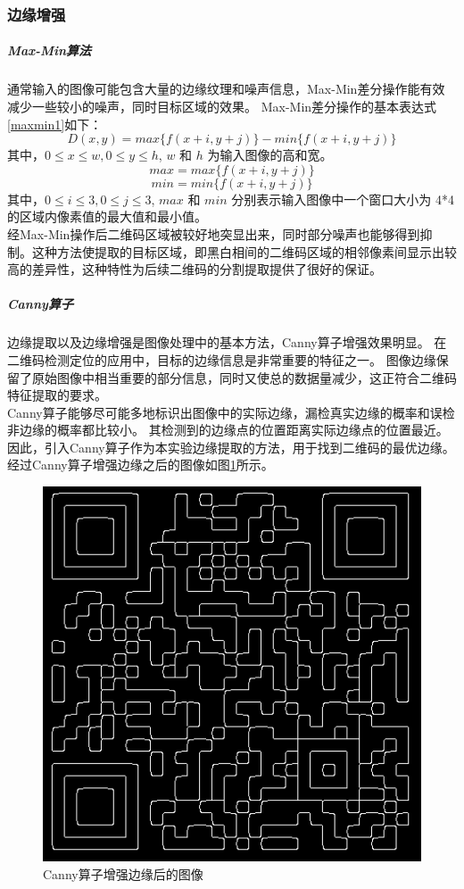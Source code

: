 \subsubsection{边缘增强}
\subparagraph{Max-Min算法}
通常输入的图像可能包含大量的边缘纹理和噪声信息，Max-Min差分操作\cite{13}能有效减少一些较小的噪声，同时目标区域的效果。
Max-Min差分操作的基本表达式\ref{maxmin1}如下：
\begin{equation}\label{maxmin1}
D(x,y) = max\{f(x+i, y+j)\} - min\{f(x+i, y+j)\}
\end{equation}
其中，$ 0 \le x \le w, 0 \le y \le h $, $ w $ 和 $ h $ 为输入图像的高和宽。\\
\begin{equation}\label{max}
max = max\{f(x+i,y+j)\}
\end{equation}
\begin{equation}\label{min}
min = min\{f(x+i,y+j)\}
\end{equation}
其中，$ 0 \le i \le 3, 0 \le j \le 3 $, $ max $ 和 $ min $ 分别表示输入图像中一个窗口大小为 4*4的区域内像素值的最大值和最小值。\\
经Max-Min操作后二维码区域被较好地突显出来，同时部分噪声也能够得到抑制。这种方法使提取的目标区域，即黑白相间的二维码区域的相邻像素间显示出较高的差异性，这种特性为后续二维码的分割提取提供了很好的保证。
\subparagraph{Canny算子}
边缘提取以及边缘增强是图像处理中的基本方法，Canny算子\cite{14}增强效果明显。
在二维码检测定位的应用中，目标的边缘信息是非常重要的特征之一。
图像边缘保留了原始图像中相当重要的部分信息，同时又使总的数据量减少，这正符合二维码特征提取的要求。\\
Canny算子能够尽可能多地标识出图像中的实际边缘，漏检真实边缘的概率和误检非边缘的概率都比较小。
其检测到的边缘点的位置距离实际边缘点的位置最近。
因此，引入Canny算子作为本实验边缘提取的方法，用于找到二维码的最优边缘。
经过Canny算子增强边缘之后的图像如图\ref{fig:canny}所示。
\begin{figure}[h]
\centering
\includegraphics[width=0.5\linewidth]{canny}
\caption[canny]{Canny算子增强边缘后的图像}
\label{fig:canny}
\end{figure}


